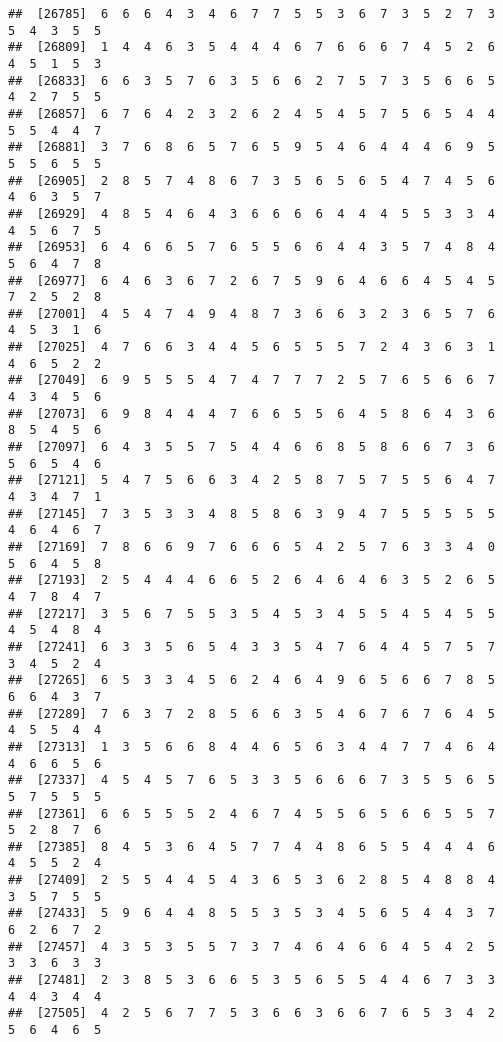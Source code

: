 \documentclass[
]{book}
\begin{document}
\begin{verbatim}
##  [26785]  6  6  6  4  3  4  6  7  7  5  5  3  6  7  3  5  2  7  3  5  4  3  5  5
##  [26809]  1  4  4  6  3  5  4  4  4  6  7  6  6  6  7  4  5  2  6  4  5  1  5  3
##  [26833]  6  6  3  5  7  6  3  5  6  6  2  7  5  7  3  5  6  6  5  4  2  7  5  5
##  [26857]  6  7  6  4  2  3  2  6  2  4  5  4  5  7  5  6  5  4  4  5  5  4  4  7
##  [26881]  3  7  6  8  6  5  7  6  5  9  5  4  6  4  4  4  6  9  5  5  5  6  5  5
##  [26905]  2  8  5  7  4  8  6  7  3  5  6  5  6  5  4  7  4  5  6  4  6  3  5  7
##  [26929]  4  8  5  4  6  4  3  6  6  6  6  4  4  4  5  5  3  3  4  4  5  6  7  5
##  [26953]  6  4  6  6  5  7  6  5  5  6  6  4  4  3  5  7  4  8  4  5  6  4  7  8
##  [26977]  6  4  6  3  6  7  2  6  7  5  9  6  4  6  6  4  5  4  5  7  2  5  2  8
##  [27001]  4  5  4  7  4  9  4  8  7  3  6  6  3  2  3  6  5  7  6  4  5  3  1  6
##  [27025]  4  7  6  6  3  4  4  5  6  5  5  5  7  2  4  3  6  3  1  4  6  5  2  2
##  [27049]  6  9  5  5  5  4  7  4  7  7  7  2  5  7  6  5  6  6  7  4  3  4  5  6
##  [27073]  6  9  8  4  4  4  7  6  6  5  5  6  4  5  8  6  4  3  6  8  5  4  5  6
##  [27097]  6  4  3  5  5  7  5  4  4  6  6  8  5  8  6  6  7  3  6  5  6  5  4  6
##  [27121]  5  4  7  5  6  6  3  4  2  5  8  7  5  7  5  5  6  4  7  4  3  4  7  1
##  [27145]  7  3  5  3  3  4  8  5  8  6  3  9  4  7  5  5  5  5  5  4  6  4  6  7
##  [27169]  7  8  6  6  9  7  6  6  6  5  4  2  5  7  6  3  3  4  0  5  6  4  5  8
##  [27193]  2  5  4  4  4  6  6  5  2  6  4  6  4  6  3  5  2  6  5  4  7  8  4  7
##  [27217]  3  5  6  7  5  5  3  5  4  5  3  4  5  5  4  5  4  5  5  4  5  4  8  4
##  [27241]  6  3  3  5  6  5  4  3  3  5  4  7  6  4  4  5  7  5  7  3  4  5  2  4
##  [27265]  6  5  3  3  4  5  6  2  4  6  4  9  6  5  6  6  7  8  5  6  6  4  3  7
##  [27289]  7  6  3  7  2  8  5  6  6  3  5  4  6  7  6  7  6  4  5  4  5  5  4  4
##  [27313]  1  3  5  6  6  8  4  4  6  5  6  3  4  4  7  7  4  6  4  4  6  6  5  6
##  [27337]  4  5  4  5  7  6  5  3  3  5  6  6  6  7  3  5  5  6  5  5  7  5  5  5
##  [27361]  6  6  5  5  5  2  4  6  7  4  5  5  6  5  6  6  5  5  7  5  2  8  7  6
##  [27385]  8  4  5  3  6  4  5  7  7  4  4  8  6  5  5  4  4  4  6  4  5  5  2  4
##  [27409]  2  5  5  4  4  5  4  3  6  5  3  6  2  8  5  4  8  8  4  3  5  7  5  5
##  [27433]  5  9  6  4  4  8  5  5  3  5  3  4  5  6  5  4  4  3  7  6  2  6  7  2
##  [27457]  4  3  5  3  5  5  7  3  7  4  6  4  6  6  4  5  4  2  5  3  3  6  3  3
##  [27481]  2  3  8  5  3  6  6  5  3  5  6  5  5  4  4  6  7  3  3  4  4  3  4  4
##  [27505]  4  2  5  6  7  7  5  3  6  6  3  6  6  7  6  5  3  4  2  5  6  4  6  5

\end{verbatim}
\end{document}
